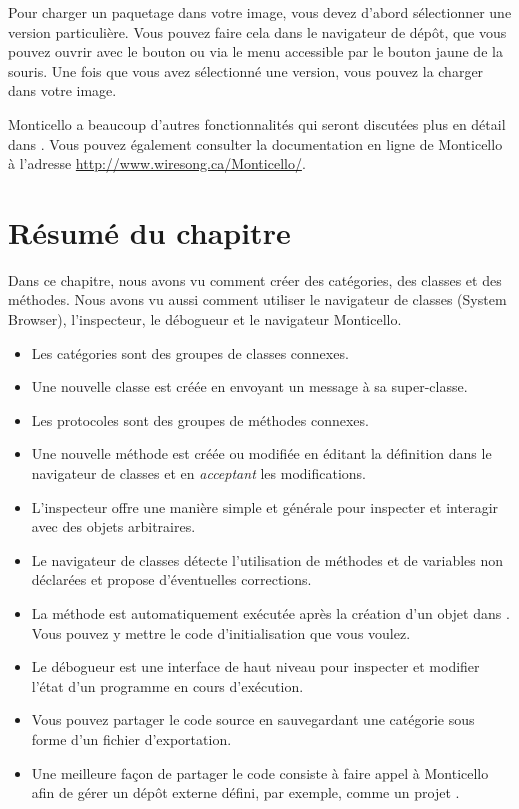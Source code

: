 \documentclass[a4paper,10pt,twoside]{book}
\begin{document}

Pour charger un paquetage dans votre image, vous devez d'abord
sélectionner une version particulière. Vous pouvez faire cela dans le
navigateur de dépôt, que vous pouvez ouvrir avec le bouton
 ou via le menu accessible par le bouton jaune de la
souris. Une fois que vous avez sélectionné une version, vous pouvez la
charger dans votre image.


Monticello a beaucoup d'autres fonctionnalités qui seront discutées
plus en détail dans .
Vous pouvez également consulter la documentation en ligne de
Monticello à l'adresse \url{http://www.wiresong.ca/Monticello/}.

\section{Résumé du chapitre}
Dans ce chapitre, nous avons vu comment créer des catégories, des classes
et des méthodes. Nous avons vu aussi comment utiliser le navigateur de
classes (System Browser), l'inspecteur, le débogueur et le
navigateur Monticello.

\begin{itemize}
  \item Les catégories sont des groupes de classes connexes.
  \item Une nouvelle classe est créée en envoyant un message à sa super-classe.
  \item Les protocoles sont des groupes de méthodes connexes.
  \item Une nouvelle méthode est créée ou modifiée en éditant la définition dans le navigateur de classes et en \emph{acceptant} les modifications.
  \item L'inspecteur offre une manière simple et générale pour inspecter et interagir avec des objets arbitraires.
  \item Le navigateur de classes détecte l'utilisation de méthodes et de variables non déclarées et propose d'éventuelles corrections.
  \item La méthode  est automatiquement exécutée après
    la création d'un objet dans \sq. Vous pouvez y mettre
    le code d'initialisation que vous voulez.
  \item Le débogueur est une interface de haut niveau pour inspecter et modifier l'état d'un programme en cours d'exécution.
  \item Vous pouvez partager le code source en sauvegardant une
    catégorie sous forme d'un fichier d'exportation.
  \item Une meilleure façon de partager le code consiste à faire
    appel à Monticello afin de gérer un dépôt externe défini, par
    exemple, comme un projet \squeaksource.
\end{itemize}

\ifx\wholebook\relax\else
\end{document}

